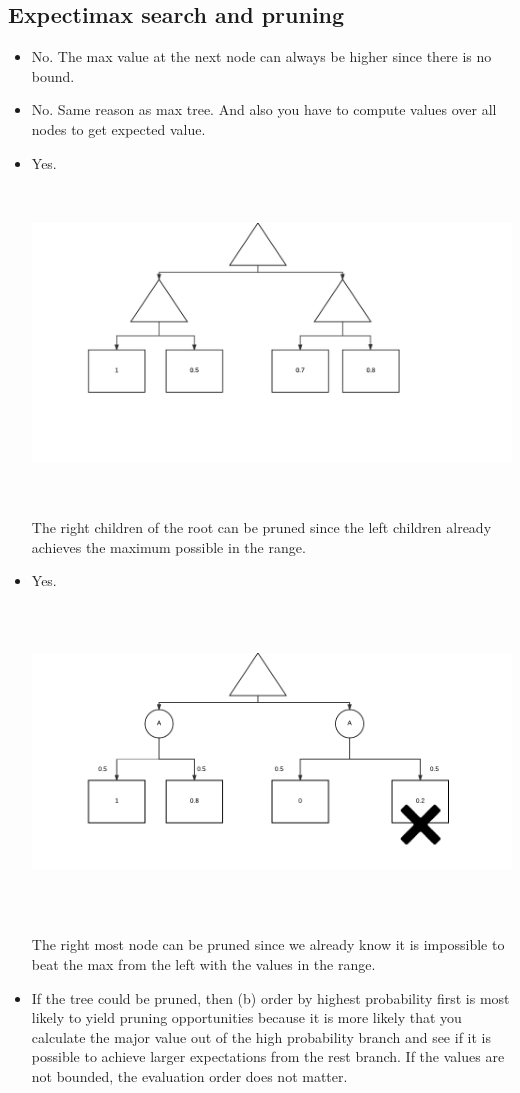 \documentclass[11pt]{article}
\begin{document}
\begin{onehalfspace}
\section{Expectimax search and pruning}
\begin{itemize}
\item
No. The max value at the next node can always be higher since there is no bound.
\item
No. Same reason as max tree. And also you have to compute values over all nodes to get expected value.
\item
Yes.
\includegraphics[width=16cm, height=9cm]{4_c.png}\\
The right children of the root can be pruned since the left children already achieves the maximum possible in the range.
\item
Yes.
\includegraphics[width=16cm, height=9cm]{4_d.png}\\
The right most node can be pruned since we already know it is impossible to beat the max from the left with the values in the range.
\item
If the tree could be pruned, then (b) order by highest probability first is most likely to yield pruning opportunities because it is more likely that you calculate the major value out of the high probability branch and see if it is possible to achieve larger expectations from the rest branch. If the values are not bounded,  the evaluation order does not matter.
\end{itemize}
\end{onehalfspace}
\end{document}
